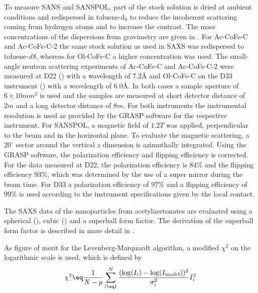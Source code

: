 \documentclass[\main/dresen_thesis.tex]{subfiles}
\begin{document}
    To measure SANS and SANSPOL, part of the stock solution is dried at ambient conditions and redispersed in toluene-$\mathrm{d_8}$ to reduce the incoherent scattering coming from hydrogen atoms and to increase the contrast.
    The mass concentrations of the dispersions from gravimetry are given in .
    For Ac-CoFe-C and Ac-CoFe-C-2 the same stock solution as used in SAXS was redispersed to toluene-\textit{d8}, whereas for Ol-CoFe-C a higher concentration was used.
    The small-angle neutron scattering experiments of Ac-CoFe-C and Ac-CoFe-C-2 were measured at D22 () with a wavelength of $7.2 \unit{\angstrom}$ and Ol-CoFe-C on the D33 instrument () with a wavelength of $6.0 \unit{\angstrom}$.
    In both cases a sample aperture of $6 \times 10 \unit{mm^2}$ is used and the samples are measured at short detector distance of $2 \unit{m}$ and a long detector distance of $8 \unit{m}$.
    For both instruments the instrumental resolution is used as provided by the GRASP software for the respective instrument.
    For SANSPOL, a magnetic field of $1.2 \unit{T}$ was applied, perpendicular to the beam and in the horizontal plane.
    To evaluate the magnetic scattering, a $20^\circ$ sector around the vertical $z$ dimension is azimuthally integrated.
    Using the GRASP software, the polarization efficiency and flipping efficiency is corrected.
    For the data measured at D22, the polarization efficiency is $84 \%$ and the flipping efficiency $93 \%$, which was determined by the use of a super mirror during the beam time.
    For D33 a polarization efficiency of $97 \%$ and a flipping efficiency of $99 \%$ is used according to the instrument specifications given by the local contact.

    The SAXS data of the nanoparticles from acetylacetonates are evaluated using a spherical (), cubic () and a superball form factor.
    The derivation of the superball form factor is described in more detail in .

    As figure of merit for the Levenberg-Marquardt algorithm\cite{Marquardt_1963_Analgo, Oliphant_2006_Guide}, a modified $\chi^2$ on the logarithmic scale is used, which is defined by
    \begin{align}
      \chi^2 \eq \frac{1}{N-p} \sum_{i\eq 1}^{N} \frac{(\log(I_i) - \log(I_\mathrm{model}))^2}{\sigma_i^2} I^2_i
    \end{align}
\end{document}
